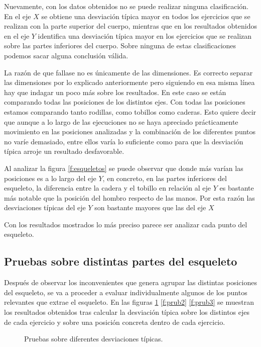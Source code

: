 Nuevamente, con los datos obtenidos no se puede realizar ninguna clasificación. En el eje $X$ se obtiene una desviación típica mayor en todos los ejercicios que se realizan con la parte superior del cuerpo, mientras que en los resultados obtenidos en el eje $Y$ identifica una desviación típica mayor en los ejercicios que se realizan sobre las partes inferiores del cuerpo. Sobre ninguna de estas clasificaciones podemos sacar alguna conclusión válida. 

La razón de que fallase no es únicamente de las dimensiones. Es correcto separar las dimensiones por lo explicado anteriormente pero siguiendo en esa misma línea hay que indagar un poco más sobre los resultados. En este caso se están comparando todas las posiciones de los distintos ejes. Con todas las posiciones estamos comparando tanto rodillas, como tobillos como caderas. Esto quiere decir que aunque a lo largo de las ejecuciones no se haya apreciado prácticamente movimiento en las posiciones analizadas y la combinación de los diferentes puntos no varíe demasiado, entre ellos varía lo suficiente como para que la desviación típica arroje un resultado desfavorable. 

Al analizar la figura \ref{f:esqueletos} se puede observar que donde más varían las posiciones es a lo largo del eje $Y$, en concreto, en las partes inferiores del esqueleto, la diferencia entre la cadera y el tobillo en relación al eje $Y$ es bastante más notable que la posición del hombro respecto de las manos. Por esta razón las desviaciones típicas del eje $Y$ son bastante mayores que las del eje $X$

Con los resultados mostrados lo más preciso parece ser analizar cada punto del esqueleto.

\subsection{Pruebas sobre distintas partes del esqueleto}

Después de observar los inconvenientes que genera agrupar las distintas posiciones del esqueleto, se va a proceder a evaluar individualmente algunos de los puntos relevantes que extrae el esqueleto. En las figuras \ref{f:prub1} \ref{f:prub2} \ref{f:prub3} se muestran los resultados obtenidos tras calcular la desviación típica sobre los distintos ejes de cada ejercicio y sobre una posición concreta dentro de cada ejercicio.


\begin{figure}
 \centering
  \vspace{1mm}
  \vspace{1mm}
    \vspace{1mm}
 \caption{Pruebas sobre diferentes desviaciones típicas.}
 \label{f:prub1}
\end{figure}

